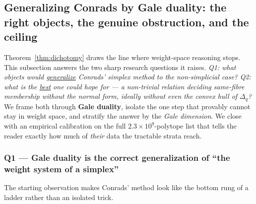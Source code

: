 \documentclass{amsart}
\begin{document}
\subsection{Generalizing Conrads by Gale duality: the right objects, the
genuine obstruction, and the ceiling}\label{sec:fibre-gale}

Theorem~\ref{thm:dichotomy} draws the line where weight-space reasoning stops.
This subsection answers the two sharp research questions it raises.
\emph{Q1: what objects would \underline{generalize} Conrads' simplex method to
the non-simplicial case?} \emph{Q2: what is the \underline{best} one could hope
for --- a non-trivial relation deciding same-fibre membership without the normal
form, ideally without even the convex hull of $\Delta_q$?} We frame both through
\textbf{Gale duality}, isolate the one step that provably cannot stay in weight
space, and stratify the answer by the \emph{Gale dimension}. We close with an
empirical calibration on the full $2.3\times10^{9}$-polytope list that tells the
reader exactly how much of \emph{their} data the tractable strata reach.

\subsubsection*{Q1 --- Gale duality is the correct generalization of ``the
weight system of a simplex''}

The starting observation makes Conrads' method look like the bottom rung of a
ladder rather than an isolated trick.
\end{document}
